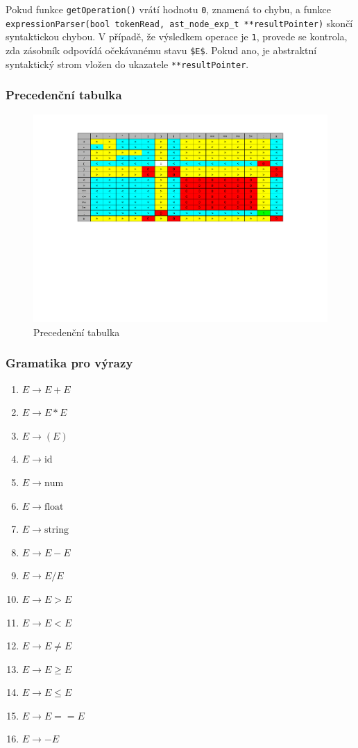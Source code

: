\documentclass[a4paper, 12pt]{article}
\begin{document}
Pokud funkce \texttt{getOperation()} vrátí hodnotu \texttt{0}, znamená to chybu, a funkce \texttt{expressionParser(bool tokenRead, ast\_node\_exp\_t **resultPointer)} skončí syntaktickou chybou. V případě, že výsledkem operace je \texttt{1}, provede se kontrola, zda zásobník odpovídá očekávanému stavu \texttt{\$E\$}. Pokud ano, je abstraktní syntaktický strom vložen do ukazatele \texttt{**resultPointer}.


\subsubsection{Precedenční tabulka}
\begin{figure}[ht!]
\begin{center}
  \includegraphics[width=1\textwidth]{images/precedence_table.pdf}
  \caption{Precedenční tabulka}
\end{center}
\end{figure}

\newpage

\subsubsection{Gramatika pro výrazy}

\begin{enumerate}
    \item $E \to E + E$
    \item $E \to E * E$
    \item $E \to (E)$
    \item $E \to \text{id}$
    \item $E \to \text{num}$
    \item $E \to \text{float}$
    \item $E \to \text{string}$
    \item $E \to E - E$
    \item $E \to E / E$
    \item $E \to E > E$
    \item $E \to E < E$
    \item $E \to E \neq E$
    \item $E \to E \geq E$
    \item $E \to E \leq E$
    \item $E \to E == E$
    \item $E \to -E$
\end{enumerate}
\end{document}
